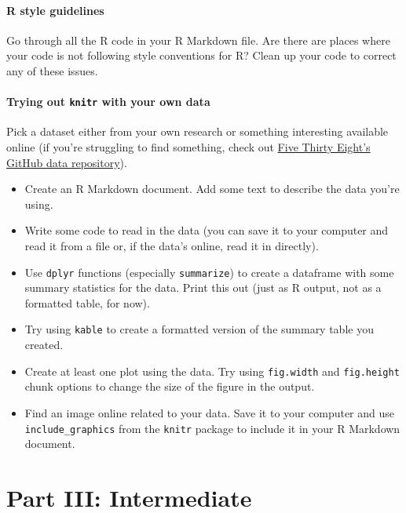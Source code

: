 \documentclass[]{book}
\providecommand{\tightlist}{%
  \setlength{\itemsep}{0pt}\setlength{\parskip}{0pt}}
\begin{document}
\subsection{R style guidelines}\label{r-style-guidelines}

Go through all the R code in your R Markdown file. Are there are places
where your code is not following style conventions for R? Clean up your
code to correct any of these issues.

\subsection{\texorpdfstring{Trying out \texttt{knitr} with your own
data}{Trying out knitr with your own data}}\label{trying-out-knitr-with-your-own-data}

Pick a dataset either from your own research or something interesting
available online (if you're struggling to find something, check out
\href{https://github.com/fivethirtyeight/data}{Five Thirty Eight's
GitHub data repository}).

\begin{itemize}
\tightlist
\item
  Create an R Markdown document. Add some text to describe the data
  you're using.
\item
  Write some code to read in the data (you can save it to your computer
  and read it from a file or, if the data's online, read it in
  directly).
\item
  Use \texttt{dplyr} functions (especially \texttt{summarize}) to create
  a dataframe with some summary statistics for the data. Print this out
  (just as R output, not as a formatted table, for now).
\item
  Try using \texttt{kable} to create a formatted version of the summary
  table you created.
\item
  Create at least one plot using the data. Try using \texttt{fig.width}
  and \texttt{fig.height} chunk options to change the size of the figure
  in the output.
\item
  Find an image online related to your data. Save it to your computer
  and use \texttt{include\_graphics} from the \texttt{knitr} package to
  include it in your R Markdown document.
\end{itemize}

\part{Part III:
Intermediate}\label{part-part-iii-intermediate}
\end{document}
